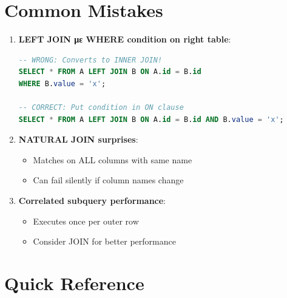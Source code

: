 \section{Common Mistakes}

\begin{warningbox}
\begin{enumerate}
    \item \textbf{LEFT JOIN με WHERE condition on right table}:
    \begin{lstlisting}[language=SQL]
-- WRONG: Converts to INNER JOIN!
SELECT * FROM A LEFT JOIN B ON A.id = B.id
WHERE B.value = 'x';

-- CORRECT: Put condition in ON clause
SELECT * FROM A LEFT JOIN B ON A.id = B.id AND B.value = 'x';
    \end{lstlisting}

    \item \textbf{NATURAL JOIN surprises}:
    \begin{itemize}
        \item Matches on ALL columns with same name
        \item Can fail silently if column names change
    \end{itemize}

    \item \textbf{Correlated subquery performance}:
    \begin{itemize}
        \item Executes once per outer row
        \item Consider JOIN for better performance
    \end{itemize}
\end{enumerate}
\end{warningbox}

\section{Quick Reference}

